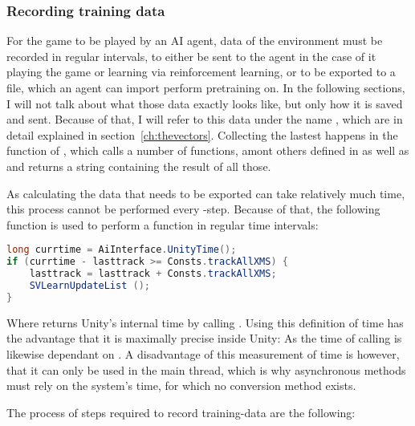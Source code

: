 \subsubsection{Recording training data}

For the game to be played by an AI agent, data of the environment must be recorded in regular intervals, to either be sent to the agent in the case of it playing the game or learning via reinforcement learning, or to be exported to a file, which an agent can import perform pretraining on. In the following sections, I will not talk about what those data exactly looks like, but only how it is saved and sent. Because of that, I will refer to this data under the name , which are in detail explained in section~\ref{ch:thevectors}. Collecting the lastest  happens in the function  of , which calls a number of functions, amont others defined in  as well as  and returns a string containing the result of all those.

As calculating the data that needs to be exported can take relatively much time, this process cannot be performed every -step. Because of that, the following function is used to perform a function in regular time intervals:
\begin{lstlisting}[language=C#,frame=none]
long currtime = AiInterface.UnityTime();
if (currtime - lasttrack >= Consts.trackAllXMS) {
	lasttrack = lasttrack + Consts.trackAllXMS; 
	SVLearnUpdateList ();
}
\end{lstlisting}%

Where  returns Unity's internal time by calling . Using this definition of time has the advantage that it is maximally precise inside Unity: As the time of calling  is likewise dependant on . A disadvantage of this measurement of time is however, that it can only be used in the main thread, which is why asynchronous methods must rely on the system's time, for which no conversion method exists.

The process of steps required to record training-data are the following:

